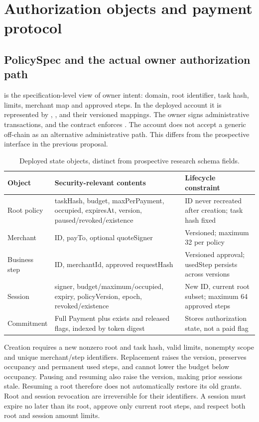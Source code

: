 \section{Authorization objects and payment protocol}\label{sec:protocol}
\subsection{PolicySpec and the actual owner authorization path}
 is the specification-level view of owner intent: domain, root identifier, task hash, limits, merchant map and approved steps. In the deployed account it is represented by , ,  and their versioned mappings. The owner signs administrative transactions, and the contract enforces . The account does not accept a generic off-chain  as an alternative administrative path. This differs from the prospective interface in the previous proposal.\citep{proposal,implementation}

\begin{table}[htbp]\centering\small
\begin{tabularx}{\linewidth}{L{2.9cm}YL{3.5cm}}\toprule
Object & Security-relevant contents & Lifecycle constraint\\\midrule
Root policy & taskHash, budget, maxPerPayment, occupied, expiresAt, version, paused/revoked/existence & ID never recreated after creation; task hash fixed\\
Merchant & ID, payTo, optional quoteSigner & Versioned; maximum 32 per policy\\
Business step & ID, merchantId, approved requestHash & Versioned approval; usedStep persists across versions\\
Session & signer, budget/maximum/occupied, expiry, policyVersion, epoch, revoked/existence & New ID, current root subset; maximum 64 approved steps\\
Commitment & Full Payment plus exists and released flags, indexed by token digest & Stores authorization state, not a paid flag\\\bottomrule
\end{tabularx}\caption{Deployed state objects, distinct from prospective research schema fields.}\label{tab:objects}\end{table}

Creation requires a new nonzero root and task hash, valid limits, nonempty scope and unique merchant/step identifiers. Replacement raises the version, preserves occupancy and permanent used steps, and cannot lower the budget below occupancy. Pausing and resuming also raise the version, making prior sessions stale. Resuming a root therefore does not automatically restore its old grants. Root and session revocation are irreversible for their identifiers. A session must expire no later than its root, approve only current root steps, and respect both root and session amount limits.

